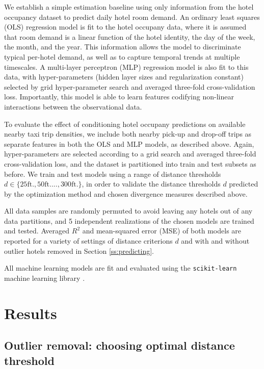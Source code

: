 \documentclass[useAMS, referee, usenatbib]{biom}
\begin{document}
We establish a simple estimation baseline using only information from the hotel occupancy dataset to predict daily hotel room demand. An ordinary least squares (OLS) regression model is fit to the hotel occupany data, where it is assumed that room demand is a linear function of the hotel identity, the day of the week, the month, and the year. This information allows the model to discriminate typical per-hotel demand, as well as to capture temporal trends at multiple timescales. A multi-layer perceptron (MLP) regression model is also fit to this data, with hyper-parameters (hidden layer sizes and regularization constant) selected by grid hyper-parameter search and averaged three-fold cross-validation loss. Importantly, this model is able to learn features codifying non-linear interactions between the observational data.

To evaluate the effect of conditioning hotel occupany predictions on available nearby taxi trip densities, we include both nearby pick-up and drop-off trips as separate features in both the OLS and MLP models, as described above. Again, hyper-parameters are selected according to a grid search and averaged three-fold cross-validation loss, and the dataset is partitioned into train and test subsets as before. We train and test models using a range of distance thresholds $d \in \{25 \mathrm{ft.}, 50 \mathrm{ft.} ..., 300 \mathrm{ft.} \}$, in order to validate the distance thresholds $d$ predicted by the optimization method and chosen divergence measures described above.

All data samples are randomly permuted to avoid leaving any hotels out of any data partitions, and 5 independent realizations of the chosen models are trained and tested. Averaged $R^2$ and mean-squared error (MSE) of both models are reported for a variety of settings of distance criterions $d$ and with and without outlier hotels removed in Section \ref{ss:predicting}.

All machine learning models are fit and evaluated using the \texttt{scikit-learn} machine learning library \citep{scikit-learn}.

\section{Results}
\label{s:results}

\subsection{Outlier removal: choosing optimal distance threshold}
\label{ss:optimization}
\end{document}

